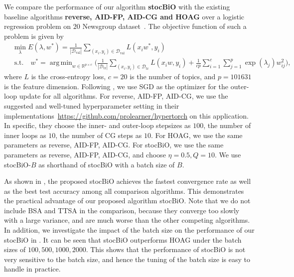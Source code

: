 \documentclass{osudissert96}
\def\gD{{\mathcal{D}}}
\DeclareMathOperator*{\argmin}{arg\,min}
\begin{document}
\vspace{0.1cm}
We compare the performance of our algorithm {\bf stocBiO} with the existing baseline algorithms {\bf reverse, AID-FP, AID-CG and HOAG }over a logistic regression problem on $20$ Newsgroup dataset~\cite{grazzi2020iteration}. The objective function of such a problem is given by 
 \begin{align*}
&\min_\lambda E(\lambda,w^*) = \frac{1}{|\gD_{\text{val}}|}\sum_{(x_i,y_i)\in \gD_{\text{val}}} L(x_iw^*, y_i) \nonumber
\\& \;\mbox{s.t.} \quad w^* = \argmin_{w\in\mathbb{R}^{p\times c}}  \Big(\frac{1}{|\gD_{\text{tr}}|}\sum_{(x_i,y_i)\in \gD_{\text{tr}}}L(x_iw, y_i)  + \frac{1}{cp} \sum_{i=1}^c\sum_{j=1}^p \exp(\lambda_j)w_{ij}^2\Big),
\end{align*}
where $L$ is the cross-entropy loss, $c=20$ is the number of topics, and $p=101631$ is the feature dimension. Following \cite{grazzi2020iteration}, we use SGD as the optimizer for the outer-loop update for all algorithms. For reverse, AID-FP, AID-CG, we use the suggested and well-tuned hyperparameter setting in their implementations~\url{https://github.com/prolearner/hypertorch} on this application. In specific, they choose the inner- and outer-loop stepsizes as $100$, the number of inner loops as $10$, the number of CG steps as $10$.  For HOAG, we use the same parameters as reverse, AID-FP, AID-CG. For stocBiO, we use the same parameters as reverse, AID-FP, AID-CG, and choose $\eta=0.5,Q=10$. We use stocBiO-$B$ as shorthand of stocBiO with a batch size of $B$.


  As shown in , the proposed stocBiO achieves the fastest convergence rate as well as the best test accuracy among all comparison algorithms. This demonstrates the practical advantage of our proposed algorithm stocBiO. Note that we do not include BSA and TTSA in the comparison, because they converge too slowly with a large variance, and are much worse than the other competing algorithms. In addition, we investigate the impact of the batch size on the performance of our stocBiO in . It can be seen that stocBiO outperforms HOAG under the batch sizes of $100,500,1000,2000$. This shows that the performance of stocBiO is not very sensitive to the batch size, and hence the tuning of the batch size is easy to handle in practice. 
\end{document}
